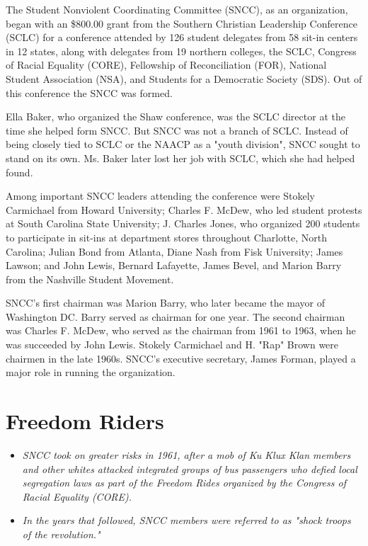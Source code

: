 The Student Nonviolent Coordinating Committee (SNCC), as an
organization, began with an \$800.00 grant from the Southern Christian
Leadership Conference (SCLC) for a conference attended by 126 student
delegates from 58 sit-in centers in 12 states, along with delegates from
19 northern colleges, the SCLC, Congress of Racial Equality (CORE),
Fellowship of Reconciliation (FOR), National Student Association (NSA),
and Students for a Democratic Society (SDS). Out of this conference the
SNCC was formed.

Ella Baker, who organized the Shaw conference, was the SCLC director at
the time she helped form SNCC. But SNCC was not a branch of SCLC.
Instead of being closely tied to SCLC or the NAACP as a "youth
division", SNCC sought to stand on its own. Ms. Baker later lost her job
with SCLC, which she had helped found.

Among important SNCC leaders attending the conference were Stokely
Carmichael from Howard University; Charles F. McDew, who led student
protests at South Carolina State University; J. Charles Jones, who
organized 200 students to participate in sit-ins at department stores
throughout Charlotte, North Carolina; Julian Bond from Atlanta, Diane
Nash from Fisk University; James Lawson; and John Lewis, Bernard
Lafayette, James Bevel, and Marion Barry from the Nashville Student
Movement.

SNCC's first chairman was Marion Barry, who later became the mayor of
Washington DC. Barry served as chairman for one year. The second
chairman was Charles F. McDew, who served as the chairman from 1961 to
1963, when he was succeeded by John Lewis. Stokely Carmichael and H.
"Rap" Brown were chairmen in the late 1960s. SNCC's executive secretary,
James Forman, played a major role in running the organization.

\section{Freedom Riders}\label{freedom-riders}

\begin{itemize}
\item
  \emph{SNCC took on greater risks in 1961, after a mob of Ku Klux Klan
  members and other whites attacked integrated groups of bus passengers
  who defied local segregation laws as part of the Freedom Rides
  organized by the Congress of Racial Equality (CORE).}
\item
  \emph{In the years that followed, SNCC members were referred to as
  "shock troops of the revolution."}
\end{itemize}

